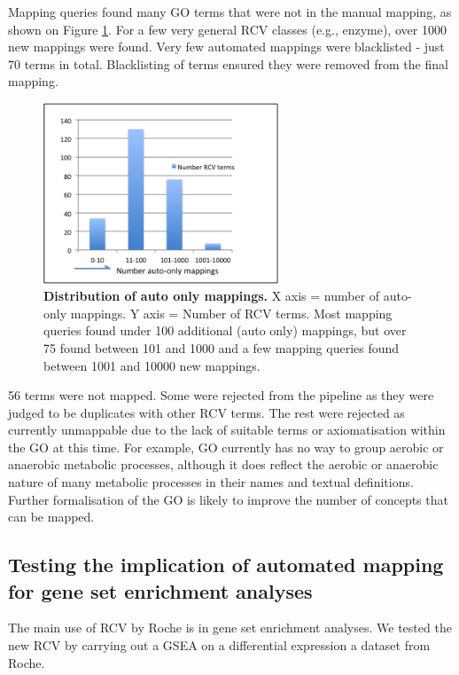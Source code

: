\documentclass[runningheads,a4paper]{llncs}
\begin{document}
{{Mapping queries found many \ac{GO} terms that were not in the manual mapping, as shown on Figure \ref{fig:auto_only}.  For a few very general RCV classes (e.g., enzyme), over 1000 new mappings were found. Very few automated mappings were blacklisted - just 70 terms in total.  Blacklisting of terms ensured they were removed from the final mapping.

\begin{figure}
\centering
\includegraphics[width=70mm]{auto_only.png}
\caption{\textbf{Distribution of auto only mappings.}
X axis = number of auto-only mappings.  Y axis = Number of RCV terms.  Most mapping queries found under 100 additional (auto only) mappings, but over 75 found between 101 and 1000 and a few mapping queries found between 1001 and 10000 new mappings.}
\label{fig:auto_only}
\end{figure}

56 terms were not mapped.  Some were rejected from the pipeline as they were judged to be duplicates with other RCV terms.  The rest were rejected as currently unmappable due to the lack of suitable terms or axiomatisation within the \ac{GO} at this time.  For example, \ac{GO} currently has no way to group aerobic or anaerobic metabolic processes, although it does reflect the aerobic or anaerobic nature of many metabolic processes in their names and textual definitions. Further formalisation of the \ac{GO} is likely to improve the number of concepts that can be mapped.

\subsection{Testing the implication of automated mapping for gene set enrichment analyses}

The main use of RCV by Roche is in gene set enrichment analyses.  We tested the new RCV by carrying out a GSEA on a differential expression a dataset from Roche. %

}}
\end{document}
